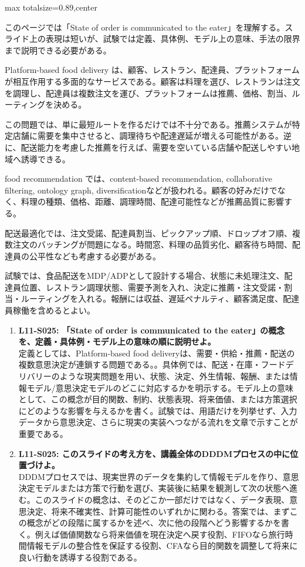 \begin{minipage}[t]{0.58\textwidth}
\begin{adjustbox}{max totalsize={\textwidth}{0.89\textheight},center}
\begin{minipage}{\textwidth}\scriptsize
{}このページでは「State of order is communicated to the eater」を理解する。スライド上の表現は短いが、試験では定義、具体例、モデル上の意味、手法の限界まで説明できる必要がある。\par
Platform-based food delivery は、顧客、レストラン、配達員、プラットフォームが相互作用する多面的なサービスである。顧客は料理を選び、レストランは注文を調理し、配達員は複数注文を運び、プラットフォームは推薦、価格、割当、ルーティングを決める。\par
この問題では、単に最短ルートを作るだけでは不十分である。推薦システムが特定店舗に需要を集中させると、調理待ちや配達遅延が増える可能性がある。逆に、配送能力を考慮した推薦を行えば、需要を空いている店舗や配送しやすい地域へ誘導できる。\par
food recommendation では、content-based recommendation, collaborative filtering, ontology graph, diversificationなどが扱われる。顧客の好みだけでなく、料理の種類、価格、距離、調理時間、配達可能性などが推薦品質に影響する。\par
配送最適化では、注文受諾、配達員割当、ピックアップ順、ドロップオフ順、複数注文のバッチングが問題になる。時間窓、料理の品質劣化、顧客待ち時間、配達員の公平性なども考慮する必要がある。\par
試験では、食品配送をMDP/ADPとして設計する場合、状態に未処理注文、配達員位置、レストラン調理状態、需要予測を入れ、決定に推薦・注文受諾・割当・ルーティングを入れる。報酬には収益、遅延ペナルティ、顧客満足度、配達員稼働を含めるとよい。\par{}\begin{enumerate}\item \textbf{L11-S025: 「State of order is communicated to the eater」の概念を、定義・具体例・モデル上の意味の順に説明せよ。}\\定義としては、Platform-based food deliveryは、需要・供給・推薦・配送の複数意思決定が連鎖する問題である。。具体例では、配送・在庫・フードデリバリーのような現実問題を用い、状態、決定、外生情報、報酬、または情報モデル/意思決定モデルのどこに対応するかを明示する。モデル上の意味として、この概念が目的関数、制約、状態表現、将来価値、または方策選択にどのような影響を与えるかを書く。試験では、用語だけを列挙せず、入力データから意思決定、さらに現実の実装へつながる流れを文章で示すことが重要である。\item \textbf{L11-S025: このスライドの考え方を、講義全体のDDDMプロセスの中に位置づけよ。}\\DDDMプロセスでは、現実世界のデータを集約して情報モデルを作り、意思決定モデルまたは方策で行動を選び、実装後に結果を観測して次の状態へ進む。このスライドの概念は、そのどこか一部だけではなく、データ表現、意思決定、将来不確実性、計算可能性のいずれかに関わる。答案では、まずこの概念がどの段階に属するかを述べ、次に他の段階へどう影響するかを書く。例えば価値関数なら将来価値を現在決定へ戻す役割、FIFOなら旅行時間情報モデルの整合性を保証する役割、CFAなら目的関数を調整して将来に良い行動を誘導する役割である。\end{enumerate}

\end{minipage}
\end{adjustbox}
\end{minipage}
